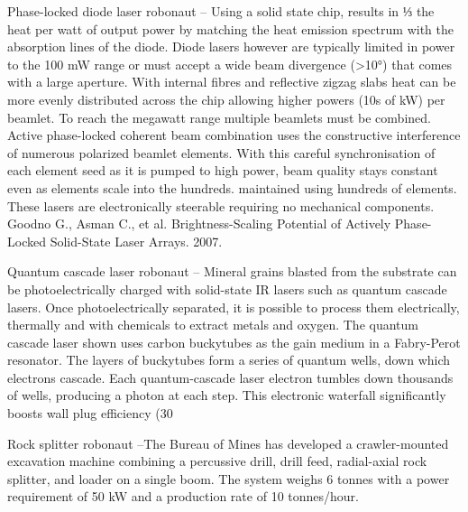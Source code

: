 \documentclass[a4paper]{book}
\begin{document}
Phase-locked diode laser robonaut – Using a solid state chip, results in ⅓ the heat per watt of output power by matching the heat emission spectrum with the absorption lines of the diode.  Diode lasers however are typically limited in power to the 100 mW range or must accept a wide beam divergence (>10°) that comes with a large aperture.  With internal fibres and reflective zigzag slabs heat can be more evenly distributed across the chip allowing higher powers (10s of kW) per beamlet.  To reach the megawatt range multiple beamlets must be combined.  Active phase-locked coherent beam combination uses the constructive interference of numerous polarized beamlet elements.  With this careful synchronisation of each element seed as it is pumped to high power, beam quality stays constant even as elements scale into the hundreds. maintained using hundreds of elements.  These lasers are electronically steerable requiring no mechanical components. Goodno G., Asman C., et al. Brightness-Scaling Potential of Actively Phase-Locked Solid-State Laser Arrays. 2007.
 
Quantum cascade laser robonaut – Mineral grains blasted from the substrate can be photoelectrically charged with solid-state IR lasers such as quantum cascade lasers. Once photoelectrically separated, it is possible to process them electrically, thermally and with chemicals to extract metals and oxygen. The quantum cascade laser shown uses carbon buckytubes as the gain medium in a Fabry-Perot resonator. The layers of buckytubes form a series of quantum wells, down which electrons cascade. Each quantum-cascade laser electron tumbles down thousands of wells, producing a photon at each step. This electronic waterfall significantly boosts wall plug efficiency (30%

Rock splitter robonaut –The Bureau of Mines has developed a crawler-mounted excavation machine combining a percussive drill, drill feed, radial-axial rock splitter, and loader on a single boom.  The system weighs 6 tonnes with a power requirement of 50 kW and a production rate of 10 tonnes/hour.
 
\end{document}
